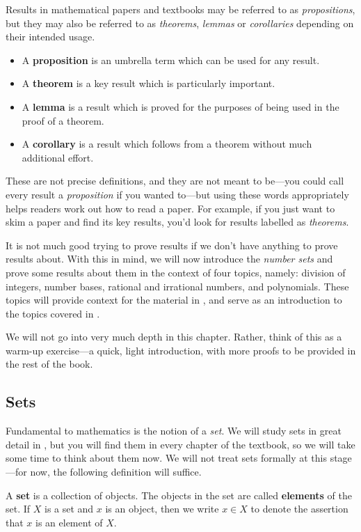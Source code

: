 Results in mathematical papers and textbooks may be referred to as \textit{propositions}, but they may also be referred to as \textit{theorems}, \textit{lemmas} or \textit{corollaries} depending on their intended usage.
\begin{itemize} 
\item A \textbf{proposition} is an umbrella term which can be used for any result.
\item A \textbf{theorem} is a key result which is particularly important.
\item A \textbf{lemma} is a result which is proved for the purposes of being used in the proof of a theorem. 
\item A \textbf{corollary} is a result which follows from a theorem without much additional effort.
\end{itemize}
These are not precise definitions, and they are not meant to be---you could call every result a \textit{proposition} if you wanted to---but using these words appropriately helps readers work out how to read a paper. For example, if you just want to skim a paper and find its key results, you'd look for results labelled as \textit{theorems}.

It is not much good trying to prove results if we don't have anything to prove results about. With this in mind, we will now introduce the \textit{number sets} and prove some results about them in the context of four topics, namely: division of integers, number bases, rational and irrational numbers, and polynomials. These topics will provide context for the material in , and serve as an introduction to the topics covered in .

We will not go into very much depth in this chapter. Rather, think of this as a warm-up exercise---a quick, light introduction, with more proofs to be provided in the rest of the book.

\subsection*{Sets}

Fundamental to mathematics is the notion of a \textit{set}. We will study sets in great detail in , but you will find them in every chapter of the textbook, so we will take some time to think about them now. We will not treat sets formally at this stage---for now, the following definition will suffice.

\begin{definition}
\label{defSetsPreliminary}
A \textbf{set} is a collection of objects. The objects in the set are called \textbf{elements} of the set. If $X$ is a set and $x$ is an object, then we write $x \in X$  to denote the assertion that $x$ is an element of $X$.
\end{definition}

